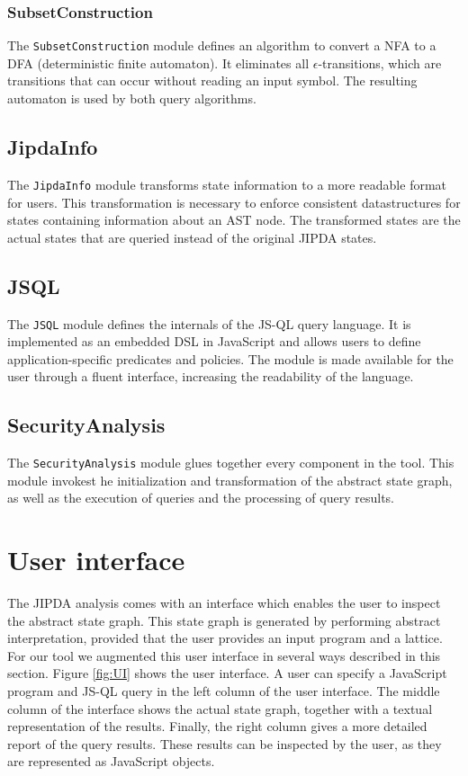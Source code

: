 \subsubsection*{SubsetConstruction}
The \texttt{SubsetConstruction} module defines an algorithm to convert a NFA to a DFA (deterministic finite automaton). It eliminates all $\epsilon$-transitions, which are transitions that can occur without reading an input symbol. The resulting automaton is used by both query algorithms.

\subsection*{JipdaInfo}
The \texttt{JipdaInfo} module transforms state information to a more readable format for users. This transformation is necessary to enforce consistent datastructures for states containing information about an AST node. The transformed states are the actual states that are queried instead of the original JIPDA states.

\subsection*{JSQL}
The \texttt{JSQL} module defines the internals of the JS-QL query language. It is implemented as an embedded DSL in JavaScript and allows users to define application-specific predicates and policies. The module is made available for the user through a fluent interface, increasing the readability of the language.

\subsection*{SecurityAnalysis}
The \texttt{SecurityAnalysis} module glues together every component in the tool. This module invokest he initialization and transformation of the abstract state graph, as well as the execution of queries and the processing of query results.

\section{User interface}
The JIPDA analysis comes with an interface which enables the user to inspect the abstract state graph. This state graph is generated by performing abstract interpretation, provided that the user provides an input program and a lattice. For our tool we augmented this user interface in several ways described in this section. Figure \ref{fig:UI} shows the user interface. A user can specify a JavaScript program and JS-QL query in the left column of the user interface. The middle column of the interface shows the actual state graph, together with a textual representation of the results. Finally, the right column gives a more detailed report of the query results. These results can be inspected by the user, as they are represented as JavaScript objects.

